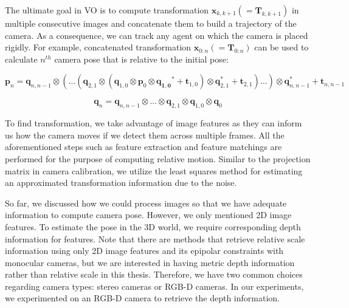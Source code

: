 \documentclass[a4paper]{report}
\numberwithin{figure}{section}
\begin{document}
The ultimate goal in VO is to compute transformation 
$\mathbf{x}_{k,k+1}(=\mathbf{T}_{k,k+1})$ in 
multiple consecutive images and concatenate them to build a trajectory of the 
camera. As a consequence, we can track any agent on which the camera is placed 
rigidly. For example, concatenated transformation 
$\mathbf{x}_{0:n}(=\mathbf{T}_{0:n})$ can be 
used to calculate $n^{th}$ camera pose that is relative to the initial pose:

\begin{equation}
  \mathbf{p}_{n} = 
  \mathbf{q}_{n, n-1} \otimes (\dots
  (\mathbf{q}_{2,1} \otimes
  (\mathbf{q}_{1,0} \otimes \mathbf{p}_0 \otimes \mathbf{q_{1,0}}^* + \mathbf{t}_{1,0})
  \otimes \mathbf{q}_{2,1}^* + \mathbf{t}_{2,1})
  \dots) \otimes \mathbf{q}_{n, n-1}^* +\mathbf{t}_{n, n-1} 
\end{equation}

\begin{equation}
  \mathbf{q}_{n} = 
  \mathbf{q}_{n,n-1} \otimes \dots \otimes \mathbf{q}_{2,1} \otimes \mathbf{q}_{1,0} \otimes \mathbf{q}_{0} 
\end{equation}

To find transformation, we take advantage of image features as they can inform 
us how the camera moves if we detect them across multiple frames.  All the 
aforementioned steps such as feature extraction and feature matchings are 
performed for the purpose of computing relative motion. Similar to the 
projection 
matrix in camera calibration, we utilize the least squares 
method for estimating an approximated transformation information due to the 
noise. 


So far, we discussed how we could process images so that we have adequate 
information to compute camera pose. However, we only mentioned 2D image 
features. To estimate the pose in the 3D world, we require corresponding depth 
information for features. Note that there are methods that retrieve relative 
scale information using only 2D image features and its epipolar constraints 
with monocular cameras, but we are interested in having metric depth 
information rather than relative scale in this thesis. Therefore, we have two 
common choices regarding camera types: stereo cameras or RGB-D cameras. In our 
experiments, we experimented on an RGB-D camera to retrieve the depth 
information.
\end{document}
